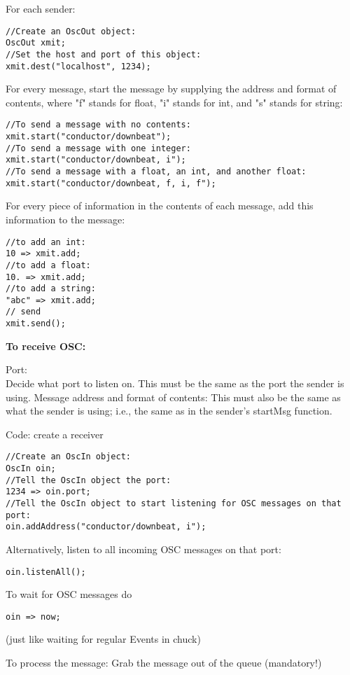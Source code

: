 For each sender:
\begin{verbatim}
//Create an OscOut object:
OscOut xmit;
//Set the host and port of this object:
xmit.dest("localhost", 1234);
\end{verbatim}

For every message, start the message by supplying the address and format of contents, where "f" stands for float, "i" stands for int, and "s" stands for string:
\begin{verbatim}
//To send a message with no contents:
xmit.start("conductor/downbeat");
//To send a message with one integer:
xmit.start("conductor/downbeat, i");
//To send a message with a float, an int, and another float:
xmit.start("conductor/downbeat, f, i, f");
\end{verbatim}

For every piece of information in the contents of each message, add this information to the message:
\begin{verbatim}
//to add an int:
10 => xmit.add;
//to add a float:
10. => xmit.add;
//to add a string:
"abc" => xmit.add;
// send
xmit.send();
\end{verbatim}

\textbf{To receive OSC: }

Port: \\
Decide what port to listen on. This must be the same as the port the sender is using. Message address and format of contents: This must also be the same as what the sender is using; i.e., the same as in the sender's startMsg function.

Code: create a receiver
\begin{verbatim}
//Create an OscIn object:
OscIn oin;
//Tell the OscIn object the port:
1234 => oin.port;
//Tell the OscIn object to start listening for OSC messages on that port:
oin.addAddress("conductor/downbeat, i");
\end{verbatim}

Alternatively, listen to all incoming OSC messages on that port:
\begin{verbatim}
oin.listenAll();
\end{verbatim}

To wait for OSC messages do
\begin{verbatim}
oin => now;
\end{verbatim}

(just like waiting for regular Events in chuck)

To process the message: Grab the message out of the queue (mandatory!)

